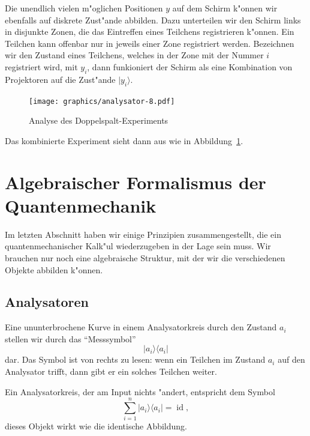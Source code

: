 Die unendlich vielen m"oglichen Positionen $y$ auf dem Schirm
k"onnen wir ebenfalls auf diskrete Zust"ande abbilden.
Dazu unterteilen wir den Schirm links in
disjunkte Zonen, die das Eintreffen eines Teilchens registrieren k"onnen.
Ein Teilchen kann offenbar nur in jeweils einer Zone registriert werden.
Bezeichnen wir den Zustand eines Teilchens, welches in der Zone mit
der Nummer $i$ registriert wird, mit $y_i$, dann funkioniert der Schirm als
eine Kombination von Projektoren auf die Zust"ande $|y_i\rangle$.
\begin{figure}
\centering
\texttt{[image: graphics/analysator-8.pdf]}
\caption{Analyse des Doppelspalt-Experiments
\label{skript:doppelspalt-analyse}}
\end{figure}
Das kombinierte Experiment sieht dann aus wie in
Abbildung~\ref{skript:doppelspalt-analyse}.

\section{Algebraischer Formalismus der Quantenmechanik}
Im letzten Abschnitt haben wir einige Prinzipien zusammengestellt,
die ein quantenmechanischer Kalk"ul wiederzugeben in der Lage sein muss.
Wir brauchen nur noch eine algebraische Struktur, mit der wir die 
verschiedenen Objekte abbilden k"onnen.

\subsection{Analysatoren}
%
Eine ununterbrochene Kurve in einem Analysatorkreis durch den Zustand
$a_i$ stellen wir durch das ``Messsymbol'' 
\[
|a_i\rangle\langle a_i|
\]
dar. Das Symbol ist von rechts zu lesen: wenn ein Teilchen
im Zustand $a_i$ auf den Analysator trifft, dann gibt er ein solches
Teilchen weiter.

Ein Analysatorkreis, der am Input nichts "andert, entspricht dem Symbol
\[
\sum_{i=1}^n |a_i\rangle \langle a_i|=\operatorname{id},
\]
dieses Objekt wirkt wie die identische Abbildung.
%

